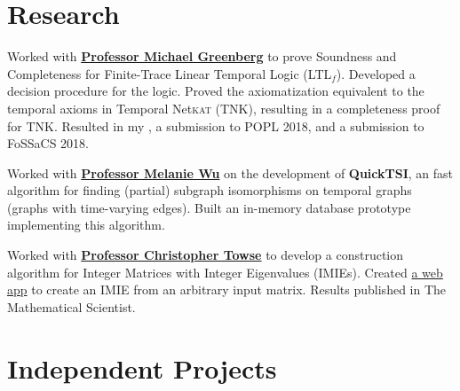 \documentclass[]{deedy-resume-openfont}
\begin{document}
\begin{minipage}[t]{0.66\textwidth}
\section{Research}
Worked with \textbf{\href{http://www.cs.pomona.edu/~michael/}{Professor Michael Greenberg}} to prove Soundness and Completeness for Finite-Trace Linear Temporal Logic (LTL$_f$). Developed a decision procedure for the logic. Proved the axiomatization equivalent to the temporal axioms in Temporal Net\textsc{kat} (TNK), resulting in a completeness proof for TNK. Resulted in my \href{https://ericthewry.github.io/pdfs/thesis.pdf}{}, a submission to POPL 2018, and a submission to FoSSaCS 2018.
\sectionsep

Worked with \textbf{\href{http://www.cs.pomona.edu/~mwu/files/bio.htm}{Professor Melanie Wu}} on the development of \textbf{QuickTSI}, an fast algorithm for finding (partial) subgraph isomorphisms on temporal graphs (graphs with time-varying edges). Built an in-memory database prototype implementing this algorithm.
\sectionsep

Worked with \textbf{\href{http://www.scrippscollege.edu/academics/faculty/profile/christopher-towse}{Professor Christopher Towse}} to develop a construction algorithm for Integer Matrices with Integer Eigenvalues (IMIEs). Created \href{http://ericthewry.github.io/integer_matrices}{a web app} to create an IMIE from an arbitrary input matrix. Results published in The Mathematical Scientist.


\section{Independent Projects}
\sectionsep


\end{minipage}
\end{document}
